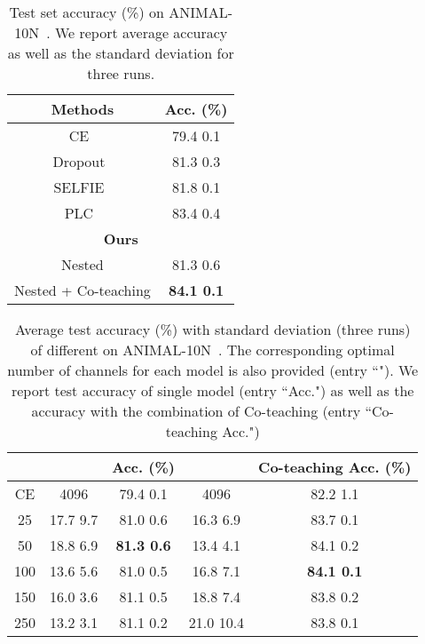 \documentclass[final]{cvpr}
\begin{document}
\begin{table}[t]
\caption{Test set accuracy (\%) on ANIMAL-10N~\cite{song2019selfie}. We report average accuracy as well as the standard deviation for three runs.}
\vspace{-5mm}
\label{tab::animal}
\begin{center}
\begin{tabular}{c|c}
\hline \hline
Methods  & Acc. (\%)   \\ \hline
CE~\cite{song2019selfie} & 79.4 {} 0.1\\
Dropout~\cite{srivastava2014dropout} & 81.3 {} 0.3\\
SELFIE~\cite{song2019selfie} & 81.8 {} 0.1\\
PLC~\cite{zhang2021learning} & 83.4 {} 0.4\\
\hline
\multicolumn{2}{c}{\textbf{Ours}} \\
Nested & 81.3 {} 0.6\\
Nested + Co-teaching & \bf 84.1 {} 0.1\\
\hline \hline
\end{tabular}
\end{center}
\vspace{-5mm}
\end{table}



\begin{table*}[ht]
\centering
\caption{Average test accuracy (\%) with standard deviation (three runs) of different  on ANIMAL-10N~\cite{song2019selfie}. 
The corresponding optimal number of channels  for each model is also provided (entry ``"). 
We report test accuracy of single model (entry ``Acc.") as well as the accuracy with the combination of Co-teaching (entry ``Co-teaching Acc.") }
\vspace{-5mm}
\label{tab::ablation}
\begin{center}
\begin{tabular}{c|cc|cc}
\hline \hline
&  & Acc. (\%) &  & Co-teaching Acc. (\%)  \\ \hline
CE &  4096& 79.4 {} 0.1 & 4096 & 82.2 {} 1.1 \\
\hline
25
&  17.7 {} 9.7 & 81.0 {} 0.6 &  16.3 {} 6.9 & 83.7 {} 0.1 \\ \hline 

50 & 18.8 {} 6.9 & \bf 81.3 {} 0.6 & 13.4 {} 4.1 & 84.1 {} 0.2 \\ \hline


100 & 13.6 {} 5.6 & 81.0 {} 0.5 & 16.8 {} 7.1 & \bf 84.1 {} 0.1 \\ \hline 

150 & 16.0 {} 3.6 &  81.1 {} 0.5 & 18.8 {} 7.4 &  83.8 {} 0.2 \\ \hline 
250 & 13.2 {} 3.1 &  81.1 {} 0.2 & 21.0 {} 10.4  &  83.8 {} 0.1 \\
\hline\hline
\end{tabular}\end{center}
\vspace{-5mm}
\end{table*}
\end{document}
